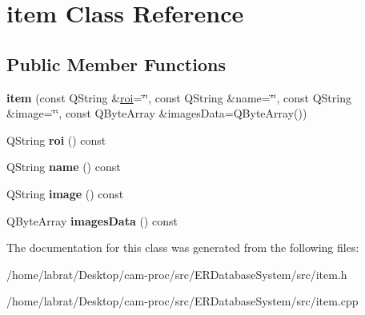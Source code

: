 \hypertarget{classitem}{}\section{item Class Reference}
\label{classitem}
\subsection*{Public Member Functions}
\begin{DoxyCompactItemize}
\item 
{\bfseries item} (const Q\+String \&\hyperlink{classroi}{roi}=\char`\"{}\char`\"{}, const Q\+String \&name=\char`\"{}\char`\"{}, const Q\+String \&image=\char`\"{}\char`\"{}, const Q\+Byte\+Array \&images\+Data=Q\+Byte\+Array())\hypertarget{classitem_a724e1f69aab482afa7b1ea4afea2fab1}{}\label{classitem_a724e1f69aab482afa7b1ea4afea2fab1}

\item 
Q\+String {\bfseries roi} () const \hypertarget{classitem_a6676e6decbaa15ae2237722963ab4692}{}\label{classitem_a6676e6decbaa15ae2237722963ab4692}

\item 
Q\+String {\bfseries name} () const \hypertarget{classitem_adb32814e07c9e896c747a0c33a26e589}{}\label{classitem_adb32814e07c9e896c747a0c33a26e589}

\item 
Q\+String {\bfseries image} () const \hypertarget{classitem_ab9bc4dc7e95eab51a7a34f791709258f}{}\label{classitem_ab9bc4dc7e95eab51a7a34f791709258f}

\item 
Q\+Byte\+Array {\bfseries images\+Data} () const \hypertarget{classitem_a86e386deb91e8d607675cd30014415e3}{}\label{classitem_a86e386deb91e8d607675cd30014415e3}

\end{DoxyCompactItemize}


The documentation for this class was generated from the following files\+:\begin{DoxyCompactItemize}
\item 
/home/labrat/\+Desktop/cam-\/proc/src/\+E\+R\+Database\+System/src/item.\+h\item 
/home/labrat/\+Desktop/cam-\/proc/src/\+E\+R\+Database\+System/src/item.\+cpp\end{DoxyCompactItemize}
